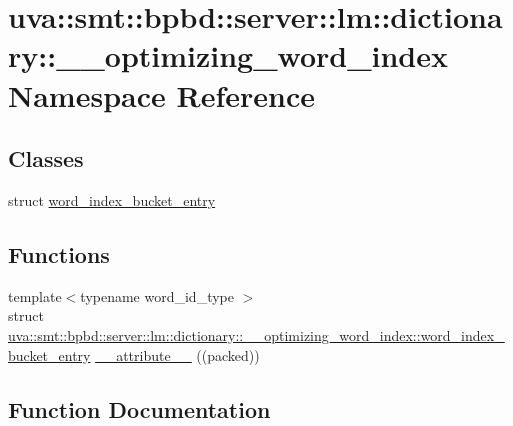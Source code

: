 \hypertarget{namespaceuva_1_1smt_1_1bpbd_1_1server_1_1lm_1_1dictionary_1_1____optimizing__word__index}{}\section{uva\+:\+:smt\+:\+:bpbd\+:\+:server\+:\+:lm\+:\+:dictionary\+:\+:\+\_\+\+\_\+optimizing\+\_\+word\+\_\+index Namespace Reference}
\label{namespaceuva_1_1smt_1_1bpbd_1_1server_1_1lm_1_1dictionary_1_1____optimizing__word__index}
\subsection*{Classes}
\begin{DoxyCompactItemize}
\item 
struct \hyperlink{structuva_1_1smt_1_1bpbd_1_1server_1_1lm_1_1dictionary_1_1____optimizing__word__index_1_1word__index__bucket__entry}{word\+\_\+index\+\_\+bucket\+\_\+entry}
\end{DoxyCompactItemize}
\subsection*{Functions}
\begin{DoxyCompactItemize}
\item 
{\footnotesize template$<$typename word\+\_\+id\+\_\+type $>$ }\\struct \hyperlink{structuva_1_1smt_1_1bpbd_1_1server_1_1lm_1_1dictionary_1_1____optimizing__word__index_1_1word__index__bucket__entry}{uva\+::smt\+::bpbd\+::server\+::lm\+::dictionary\+::\+\_\+\+\_\+optimizing\+\_\+word\+\_\+index\+::word\+\_\+index\+\_\+bucket\+\_\+entry} \hyperlink{namespaceuva_1_1smt_1_1bpbd_1_1server_1_1lm_1_1dictionary_1_1____optimizing__word__index_a1dbc9f299cedd6a867e220ddfc543ee0}{\+\_\+\+\_\+attribute\+\_\+\+\_\+} ((packed))
\end{DoxyCompactItemize}


\subsection{Function Documentation}
\hypertarget{namespaceuva_1_1smt_1_1bpbd_1_1server_1_1lm_1_1dictionary_1_1____optimizing__word__index_a1dbc9f299cedd6a867e220ddfc543ee0}{}

